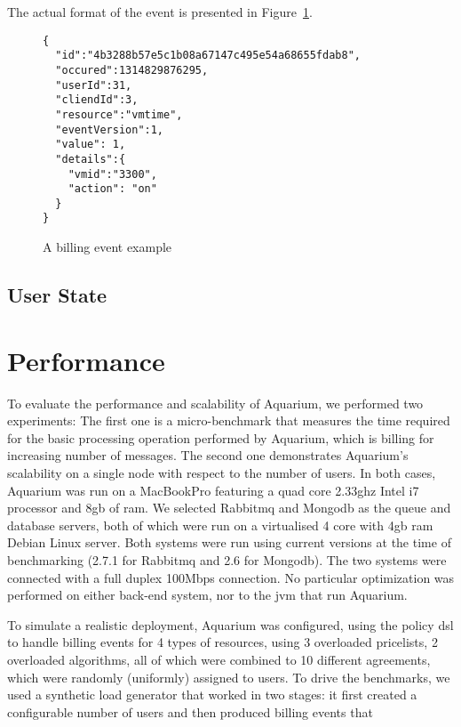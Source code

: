 \documentclass[preprint,10pt]{sigplanconf}
\begin{document}
The actual format of the event is presented in Figure~\ref{fig:resevt}.

\begin{figure}
\lstset{language=C, basicstyle=\footnotesize,
stringstyle=\ttfamily, 
flexiblecolumns=true, aboveskip=-0.9em, belowskip=0em, lineskip=0em}

\begin{lstlisting}
{
  "id":"4b3288b57e5c1b08a67147c495e54a68655fdab8",
  "occured":1314829876295,
  "userId":31,
  "cliendId":3,
  "resource":"vmtime",
  "eventVersion":1,
  "value": 1,
  "details":{
    "vmid":"3300",
    "action": "on"
  }
}
\end{lstlisting}
\caption{A billing event example} 
\label{fig:resevt}

\end{figure}

\subsection{User State}
\label{sec:ustate}

\section{Performance}

To evaluate the performance and scalability of Aquarium, we performed two
experiments: The first one is a micro-benchmark that measures the time required
for the basic processing operation performed by Aquarium, which is billing for
increasing number of messages. The second one demonstrates Aquarium's
scalability on a single node with respect to the number of users.  In both
cases, Aquarium was run on a MacBookPro featuring a quad core 2.33{\sc g}hz
Intel i7 processor and 8{\sc gb} of {\sc ram}. We selected Rabbit{\sc mq} and
Mongo{\sc db} as the queue and database servers, both of which were run on a
virtualised 4 core with 4{\sc gb} {\sc ram} Debian Linux server. Both systems
were run using current versions at the time of benchmarking (2.7.1 for
Rabbit{\sc mq} and 2.6 for Mongo{\sc db}).  The two systems were connected with
a full duplex 100Mbps connection.  No particular optimization was performed on
either back-end system, nor to the {\sc jvm} that run Aquarium. 

To simulate a realistic deployment, Aquarium was configured, using the policy
{\sc dsl} to handle billing events for 4 types of resources, using 3 overloaded
pricelists, 2 overloaded algorithms, all of which were combined to 10 different
agreements, which were randomly (uniformly) assigned to users. To drive the
benchmarks, we used a synthetic load generator that worked in two stages: it
first created a configurable number of users and then produced billing events
that 
\end{document}
